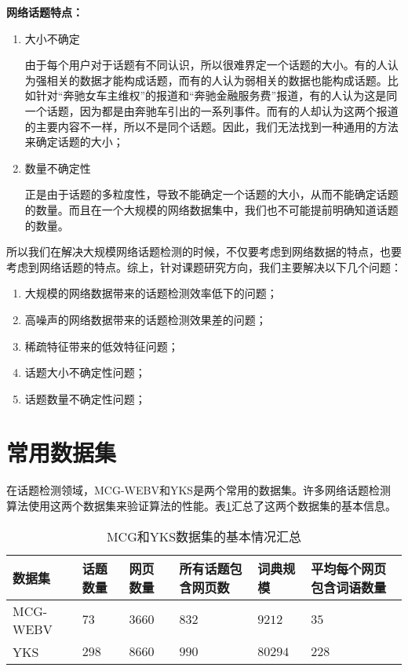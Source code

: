 \textbf{网络话题特点：}
\begin{enumerate}
    \item[(1)] 大小不确定

    由于每个用户对于话题有不同认识，所以很难界定一个话题的大小。有的人认为强相关的数据才能构成话题，而有的人认为弱相关的数据也能构成话题。比如针对“奔驰女车主维权”的报道和“奔驰金融服务费”报道，有的人认为这是同一个话题，因为都是由奔驰车引出的一系列事件。而有的人却认为这两个报道的主要内容不一样，所以不是同个话题。因此，我们无法找到一种通用的方法来确定话题的大小；

    \item[(2)] 数量不确定性

    正是由于话题的多粒度性，导致不能确定一个话题的大小，从而不能确定话题的数量。而且在一个大规模的网络数据集中，我们也不可能提前明确知道话题的数量。
\end{enumerate}

所以我们在解决大规模网络话题检测的时候，不仅要考虑到网络数据的特点，也要考虑到网络话题的特点。综上，针对课题研究方向，我们主要解决以下几个问题：
\begin{enumerate}
    \item[(1)] 大规模的网络数据带来的话题检测效率低下的问题；
    \item[(2)] 高噪声的网络数据带来的话题检测效果差的问题；
    \item[(3)] 稀疏特征带来的低效特征问题；
    \item[(4)] 话题大小不确定性问题；
    \item[(5)] 话题数量不确定性问题；
\end{enumerate}



\section{常用数据集}

在话题检测领域，MCG-WEBV\citep{cao-2009-mcg}和YKS\citep{zhang2013cross}是两个常用的数据集。许多网络话题检测算法使用这两个数据集来验证算法的性能。表\ref{tab:dataset}汇总了这两个数据集的基本信息。
\begin{table}[!htbp]
    \caption{MCG和YKS数据集的基本情况汇总}
    \label{tab:dataset}
    \centering
    \begin{tabular}{|p{2.35cm}<{\centering}|p{1cm}<{\centering}|p{1cm}<{\centering}|p{2.5cm}<{\centering}|p{1cm}<{\centering}|p{3cm}<{\centering}|}
        \hline
        数据集 & 话题数量 & 网页数量 & 所有话题包含网页数 & 词典规模 & 平均每个网页包含词语数量\\
        \hline
        \hline
        MCG-WEBV & $73$ & $3660$ & $832$ & $9212$ & $35$\\
        \hline
        YKS & $298$ & $8660$ & $990$ & $80294$ & $228$\\
        \hline
    \end{tabular}
\end{table}

